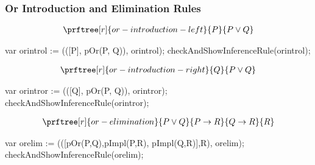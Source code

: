\documentclass[letterpaper,10pt,english]{sphinxmanual}
\begin{document}
\subsubsection{Or Introduction and Elimination Rules}
\label{\detokenize{13-consequence:or-introduction-and-elimination-rules}}\begin{equation*}
\begin{split}\prftree[r]{or-introduction-left}{P}{P \lor Q}\end{split}
\end{equation*}
\begin{sphinxVerbatim}[commandchars=\\\{\}]
var or\PYGZus{}intro\PYGZus{}l  := (([P], pOr(P, Q)),           \PYGZdq{}or\PYGZus{}intro\PYGZus{}l\PYGZdq{});
checkAndShowInferenceRule(or\PYGZus{}intro\PYGZus{}l);
\end{sphinxVerbatim}
\begin{equation*}
\begin{split}\prftree[r]{or-introduction-right}{Q}{P \lor Q}\end{split}
\end{equation*}
\begin{sphinxVerbatim}[commandchars=\\\{\}]
var or\PYGZus{}intro\PYGZus{}r  := (([Q], pOr(P, Q)),           \PYGZdq{}or\PYGZus{}intro\PYGZus{}r\PYGZdq{});
checkAndShowInferenceRule(or\PYGZus{}intro\PYGZus{}r);
\end{sphinxVerbatim}
\begin{equation*}
\begin{split}\prftree[r]{or-elimination}{P \lor Q}{P \rightarrow R}{Q \rightarrow R}{R}\end{split}
\end{equation*}
\begin{sphinxVerbatim}[commandchars=\\\{\}]
var or\PYGZus{}elim     := (([pOr(P,Q),pImpl(P,R), pImpl(Q,R)],R), \PYGZdq{}or\PYGZus{}elim\PYGZdq{});
checkAndShowInferenceRule(or\PYGZus{}elim);
\end{sphinxVerbatim}
\end{document}
